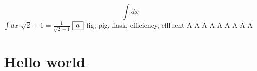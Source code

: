 \documentclass{article}
\begin{document}
\begin{equation}
  \int dx 
\end{equation}
\newpage
$\int dx$
\newpage
$\sqrt2+1=\frac1{\sqrt2-1}$
\newpage
{}
\newpage
\( \begin{array}{|r|} \hline a \cr \hline \end{array} \)
\newpage
fig, pig, flask, efficiency, effluent
\newpage
\Huge A \LARGE A \Large A \large A \normalsize A \small A
\footnotesize A \scriptsize A \tiny A
\newpage
\color{yellow}

\section*{Hello world}
\pagecolor{blue}
\end{document}
